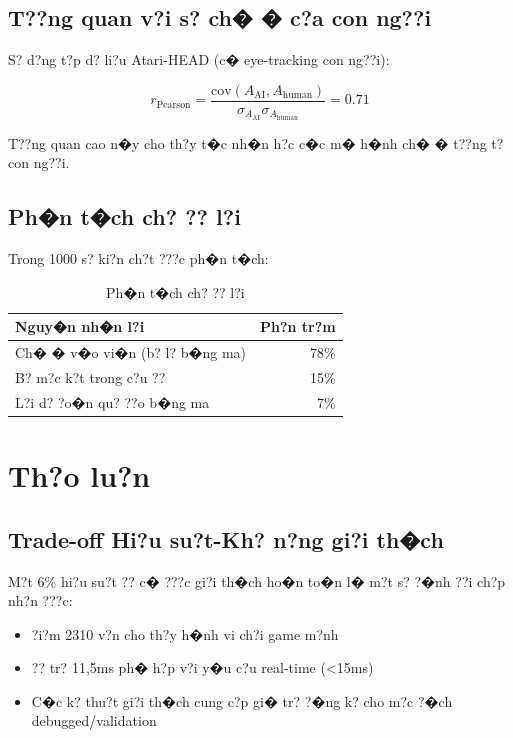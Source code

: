 \documentclass[11pt,a4paper]{article}
\begin{document}
\subsection{T??ng quan v?i s? ch� � c?a con ng??i}

S? d?ng t?p d? li?u Atari-HEAD (c� eye-tracking con ng??i):

\begin{equation}
r_{\text{Pearson}} = \frac{\text{cov}(A_{\text{AI}}, A_{\text{human}})}{\sigma_{A_{\text{AI}}} \sigma_{A_{\text{human}}}} = 0.71
\end{equation}

T??ng quan cao n�y cho th?y t�c nh�n h?c c�c m� h�nh ch� � t??ng t? con ng??i.

\subsection{Ph�n t�ch ch? ?? l?i}

Trong 1000 s? ki?n ch?t ???c ph�n t�ch:

\begin{table}[H]
\centering
\small
\begin{tabular}{lr}
\toprule
\textbf{Nguy�n nh�n l?i} & \textbf{Ph?n tr?m} \\
\midrule
Ch� � v�o vi�n (b? l? b�ng ma) & 78\% \\
B? m?c k?t trong c?u ?? & 15\% \\
L?i d? ?o�n qu? ??o b�ng ma & 7\% \\
\bottomrule
\end{tabular}
\caption{Ph�n t�ch ch? ?? l?i}
\end{table}

\section{Th?o lu?n}

\subsection{Trade-off Hi?u su?t-Kh? n?ng gi?i th�ch}

M?t 6\% hi?u su?t ?? c� ???c gi?i th�ch ho�n to�n l� m?t s? ?�nh ??i ch?p nh?n ???c:
\begin{itemize}
    \item ?i?m 2310 v?n cho th?y h�nh vi ch?i game m?nh
    \item ?? tr? 11,5ms ph� h?p v?i y�u c?u real-time (<15ms)
    \item C�c k? thu?t gi?i th�ch cung c?p gi� tr? ?�ng k? cho m?c ?�ch debugged/validation
\end{itemize}
\end{document}
